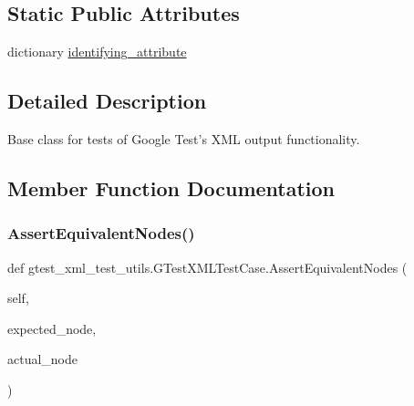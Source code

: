 \subsection*{Static Public Attributes}
\begin{DoxyCompactItemize}
\item 
dictionary \hyperlink{classgtest__xml__test__utils_1_1_g_test_x_m_l_test_case_a0e3a4e84e18f29d2248dcd670a0a6ae6}{identifying\+\_\+attribute}
\end{DoxyCompactItemize}


\subsection{Detailed Description}
\begin{DoxyVerb}Base class for tests of Google Test's XML output functionality.
\end{DoxyVerb}
 

\subsection{Member Function Documentation}
\mbox{\label{classgtest__xml__test__utils_1_1_g_test_x_m_l_test_case_a977273e8863f4f41d121bb5a64b08d32}} 
\subsubsection{\texorpdfstring{Assert\+Equivalent\+Nodes()}{AssertEquivalentNodes()}}
{\footnotesize\ttfamily def gtest\+\_\+xml\+\_\+test\+\_\+utils.\+G\+Test\+X\+M\+L\+Test\+Case.\+Assert\+Equivalent\+Nodes (\begin{DoxyParamCaption}\item[{}]{self,  }\item[{}]{expected\+\_\+node,  }\item[{}]{actual\+\_\+node }\end{DoxyParamCaption})}

